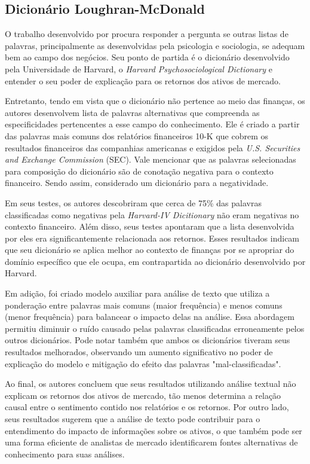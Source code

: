\subsection{Dicionário Loughran-McDonald}

O trabalho desenvolvido por  procura responder a pergunta se outras listas de palavras, principalmente as desenvolvidas pela psicologia e sociologia, se adequam bem ao campo dos negócios. Seu ponto de partida é o dicionário desenvolvido pela Universidade de Harvard, o \textit{Harvard Psychosociological Dictionary} e entender o seu poder de explicação para os retornos dos ativos de mercado.

Entretanto, tendo em vista que o dicionário não pertence ao meio das finanças, os autores desenvolvem lista de palavras alternativas que compreenda as especificidades pertencentes a esse campo do conhecimento. Ele é criado a partir das palavras mais comuns dos relatórios financeiros 10-K que cobrem os resultados financeiros das companhias americanas e exigidos pela \textit{U.S. Securities and Exchange Commission} (SEC). Vale mencionar que as palavras selecionadas para composição do dicionário são de conotação negativa para o contexto financeiro. Sendo assim, considerado um dicionário para a negatividade.

Em seus testes, os autores descobriram que cerca de 75\% das palavras classificadas como negativas pela \textit{Harvard-IV Dicitionary} não eram negativas no contexto financeiro. Além disso, seus testes apontaram que a lista desenvolvida por eles era significantemente relacionada aos retornos. Esses resultados indicam que seu dicionário se aplica melhor ao contexto de finanças por se apropriar do domínio específico que ele ocupa, em contrapartida ao dicionário desenvolvido por Harvard.

Em adição, foi criado modelo auxiliar para análise de texto que utiliza a ponderação entre palavras mais comuns (maior frequência) e menos comuns (menor frequência) para balancear o impacto delas na análise. Essa abordagem permitiu diminuir o ruído causado pelas palavras classificadas erroneamente pelos outros dicionários. Pode notar também que ambos os dicionários tiveram seus resultados melhorados, observando um aumento significativo no poder de explicação do modelo e mitigação do efeito das palavras "mal-classificadas".

Ao final, os autores concluem que seus resultados utilizando análise textual não explicam os retornos dos ativos de mercado, tão menos determina a relação causal entre o sentimento contido nos relatórios e os retornos. Por outro lado, seus resultados sugerem que a análise de texto pode contribuir para o entendimento do impacto de informações sobre os ativos, o que também pode ser uma forma eficiente de analistas de mercado identificarem fontes alternativas de conhecimento para suas análises.

